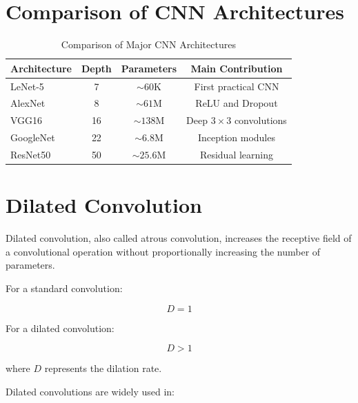 \documentclass[12pt,a4paper]{article}
\begin{document}

\section{Comparison of CNN Architectures}

\begin{table}[H]
\centering
\caption{Comparison of Major CNN Architectures}
\begin{tabular}{lccc}
\toprule
\textbf{Architecture} & \textbf{Depth} & \textbf{Parameters} & \textbf{Main Contribution} \\
\midrule
LeNet-5 & 7 & $\sim60$K & First practical CNN \\
AlexNet & 8 & $\sim61$M & ReLU and Dropout \\
VGG16 & 16 & $\sim138$M & Deep $3\times3$ convolutions \\
GoogleNet & 22 & $\sim6.8$M & Inception modules \\
ResNet50 & 50 & $\sim25.6$M & Residual learning \\
\bottomrule
\end{tabular}
\end{table}


\section{Dilated Convolution}

Dilated convolution, also called atrous convolution, increases the receptive field of a convolutional operation without proportionally increasing the number of parameters.

For a standard convolution:

\begin{equation}
D=1
\end{equation}

For a dilated convolution:

\begin{equation}
D>1
\end{equation}

where $D$ represents the dilation rate.

Dilated convolutions are widely used in:
\end{document}
